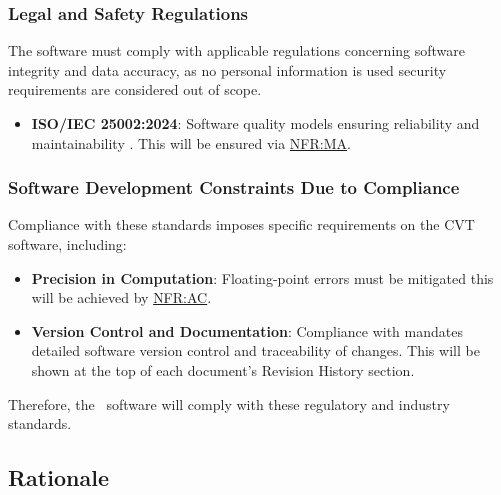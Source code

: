 \documentclass[12pt]{article}
\newcommand{\hpref}[1]{\hyperref[#1]{#1}}
\begin{document}
\subsubsection{Legal and Safety Regulations}
The software must comply with applicable regulations concerning software integrity and data accuracy, as no personal information is used security requirements are considered out of scope.
\begin{itemize}
    \item \textbf{ISO/IEC 25002:2024}: Software quality models ensuring reliability and maintainability \cite{ISO26262Standard}. This will be ensured via \hpref{NFR:MA}. 
\end{itemize}

\subsubsection{Software Development Constraints Due to Compliance}
Compliance with these standards imposes specific requirements on the CVT software, including:
\begin{itemize}
    \item \textbf{Precision in Computation}: Floating-point errors must be mitigated this will be achieved by \hpref{NFR:AC}.
    \item \textbf{Version Control and Documentation}: Compliance with \cite{ISO26262Standard} mandates detailed software version control and traceability of changes. This will be shown at the top of each document's Revision History section. 
\end{itemize}

\noindent Therefore, the \progname \ software will comply with these regulatory and industry standards.

\subsection{Rationale}
\end{document}
